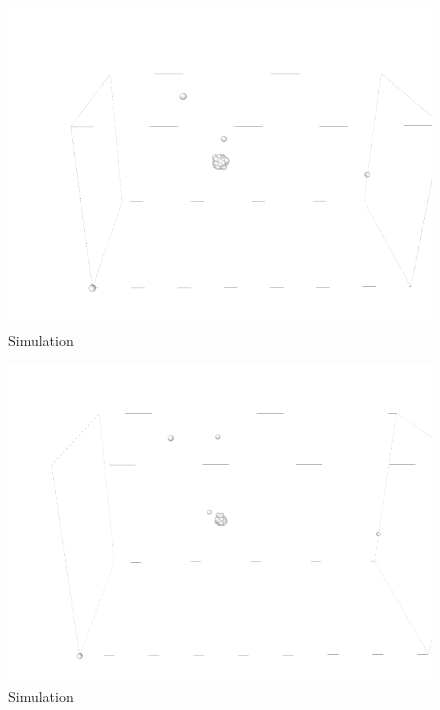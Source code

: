 \begin{figure}[!h]
	\begin{center}
		\includegraphics[scale= 1]{Figure/3Image.png}
	\end{center}
	\caption[Simulation]{Simulation }
	\label{Simulation3}
\end{figure}
\begin{figure}[!h]
	\begin{center}
		\includegraphics[scale= 1]{Figure/4Image.png}
	\end{center}
	\caption[Simulation]{Simulation }
	\label{Simulation4}
\end{figure}
